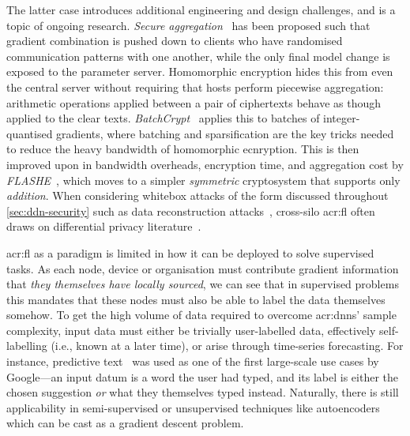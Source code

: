 The latter case introduces additional engineering and design challenges, and is a topic of ongoing research.
\emph{Secure aggregation}~\parencite{DBLP:conf/ccs/BonawitzIKMMPRS17} has been proposed such that gradient combination is pushed down to clients who have randomised communication patterns with one another, while the only final model change is exposed to the parameter server.
Homomorphic encryption hides this from even the central server without requiring that hosts perform piecewise aggregation: arithmetic operations applied between a pair of ciphertexts behave as though applied to the clear texts.
\emph{BatchCrypt}~\parencite{DBLP:conf/usenix/ZhangLX00020} applies this to batches of integer-quantised gradients, where batching and sparsification are the key tricks needed to reduce the heavy bandwidth of homomorphic ecnryption.
This is then improved upon in bandwidth overheads, encryption time, and aggregation cost by \emph{FLASHE}~\parencite{DBLP:journals/corr/abs-2109-00675}, which moves to a simpler \emph{symmetric} cryptosystem that supports only \emph{addition}.
When considering whitebox attacks of the form discussed throughout \cref{sec:ddn-security} such as data reconstruction attacks~\parencite{DBLP:conf/icml/LamW0RM21}, cross-silo \gls{acr:fl} often draws on differential privacy literature~\parencite{DBLP:conf/iclr/McMahanRT018}.



\gls{acr:fl} as a paradigm is limited in how it can be deployed to solve supervised tasks.
As each node, device or organisation must contribute gradient information that \emph{they themselves have locally sourced}, we can see that in supervised problems this mandates that these nodes must also be able to label the data themselves somehow.
To get the high volume of data required to overcome \glspl{acr:dnn}' sample complexity, input data must either be trivially user-labelled data, effectively self-labelling (i.e., known at a later time), or arise through time-series forecasting.
For instance, predictive text~\parencite{federated-learning-blog} was used as one of the first large-scale use cases by Google---an input datum is a word the user had typed, and its label is either the chosen suggestion \emph{or} what they themselves typed instead.
Naturally, there is still applicability in semi-supervised or unsupervised techniques like autoencoders~\parencite{DBLP:journals/ftml/KingmaW19} which can be cast as a gradient descent problem.

